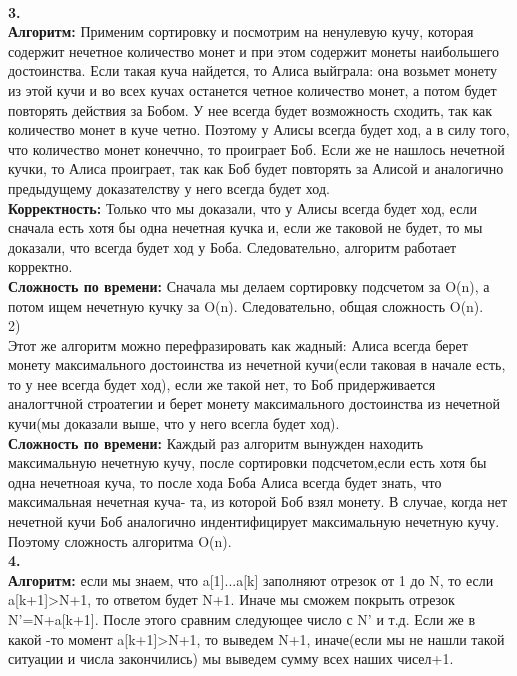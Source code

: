 \documentclass[a4paper,12pt]{article}
\begin{document}
\\
\textbf{3.}\\
\textbf{Алгоритм:} Применим сортировку и посмотрим на ненулевую кучу, которая содержит нечетное количество монет и при этом содержит монеты наибольшего достоинства. Если такая куча найдется, то Алиса выйграла: она возьмет монету из этой кучи и во всех кучах останется четное количество монет, а потом будет повторять действия за Бобом. У нее всегда будет возможность сходить, так как количество монет в куче четно. Поэтому у Алисы всегда будет ход, а в силу того, что количество монет конеччно, то проиграет  Боб. Если же не нашлось нечетной кучки, то Алиса проиграет, так как Боб будет повторять за Алисой и аналогично предыдущему доказателству у него всегда будет ход.\\
\textbf{Корректность:} Только что мы доказали, что у Алисы всегда будет ход, если сначала есть хотя бы одна нечетная кучка и, если же таковой не будет, то мы доказали, что всегда будет ход у Боба. Следовательно, алгоритм работает корректно.\\
\textbf{Сложность по времени:} Сначала мы делаем сортировку подсчетом за O(n), а потом ищем нечетную кучку за O(n). Следовательно, общая сложность  O(n).\\
2)\\
Этот же алгоритм можно перефразировать как жадный: Алиса всегда берет монету максимального достоинства из нечетной кучи(если таковая в начале есть, то у нее всегда будет ход), если же такой нет, то Боб придерживается аналогтчной строатегии и берет монету максимального достоинства из нечетной кучи(мы доказали выше, что у него всегла будет ход).\\
\textbf{Сложность по времени:} Каждый раз алгоритм вынужден находить максимальную нечетную кучу, после сортировки подсчетом,если есть хотя бы одна нечетноая куча, то после хода Боба Алиса всегда будет знать, что максимальная нечетная куча- та, из которой Боб взял монету. В случае, когда нет нечетной кучи Боб аналогично индентифицирует максимальную нечетную кучу. Поэтому сложность алгоритма O(n).\\
\textbf{4.}\\
\textbf{Алгоритм:} если мы  знаем, что a[1]...a[k] заполняют отрезок от 1 до N, то если a[k+1]>N+1, то ответом будет N+1. Иначе мы сможем покрыть отрезок N'=N+a[k+1]. После этого сравним следующее число с N' и т.д. Если же в какой -то момент a[k+1]>N+1, то выведем N+1, иначе(если мы не нашли такой ситуации и числа закончились) мы выведем сумму всех наших чисел+1.\\
\end{document}
